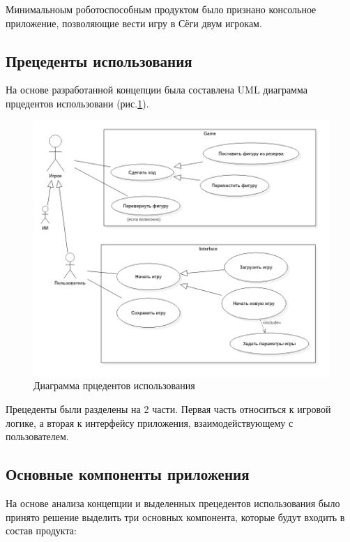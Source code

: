 Минимальноым роботоспособным продуктом было признано консольное приложение, позволяющие вести игру в Сёги двум игрокам. 

\subsection{Прецеденты использования}

На основе разработанной концепции была составлена UML диаграмма прцедентов использовани (рис.\ref{pic:use_case}).

\begin{figure}[H]
	\begin{center}
		\includegraphics[scale=0.5]{../diagrams/UseCaseDiagram1.png}
		\caption{Диаграмма прцедентов использования}
		\label{pic:use_case}
	\end{center}
\end{figure}

Прецеденты были разделены на 2 части. Первая часть относиться к игровой логике, а вторая к интерфейсу приложения, взаимодействующему с пользователем.

\subsection{Основные компоненты приложения}

На основе анализа концепции и выделенных прецедентов использования было принято решение выделить три основных компонента, которые будут входить в состав продукта:

